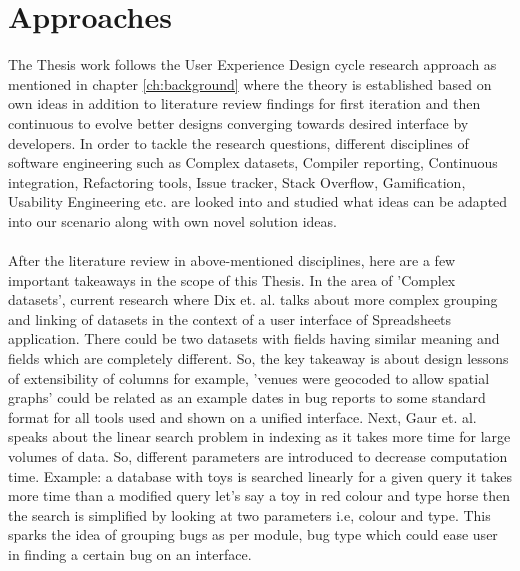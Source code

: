 \chapter{Approaches}
\label{ch:approaches}

The Thesis work follows the User Experience Design cycle research approach as mentioned in chapter \ref{ch:background} where the theory is established based on own ideas in addition to literature review findings for first iteration and then continuous to evolve better designs converging towards desired interface by developers. In order to tackle the research questions, different disciplines of software engineering such as Complex datasets, Compiler reporting, Continuous integration, Refactoring tools, Issue tracker, Stack Overflow, Gamification, Usability Engineering etc. are looked into and studied what ideas can be adapted into our scenario along with own novel solution ideas.\\ \\

After the literature review in above-mentioned disciplines, here are a few important takeaways in the scope of this Thesis. In the area of 'Complex datasets', current research where Dix et. al. \cite{Dix} talks about more complex grouping and linking of datasets in the context of a user interface of Spreadsheets application. There could be two datasets with fields having similar meaning and fields which are completely different. So, the key takeaway is about design lessons of extensibility of columns for example, 'venues were geocoded to allow spatial graphs' could be related as an example dates in bug reports to some standard format for all tools used and shown on a unified interface. Next, Gaur et. al. \cite{Gaur} speaks about the linear search problem in indexing as it takes more time for large volumes of data. So, different parameters are introduced to decrease computation time. Example: a database with toys is searched linearly for a given query it takes more time than a modified query let's say a toy in red colour and type horse then the search is simplified by looking at two parameters i.e, colour and type. This sparks the idea of grouping bugs as per module, bug type which could ease user in finding a certain bug on an interface.  \\ \\

